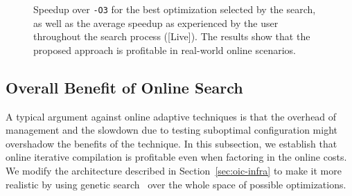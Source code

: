\begin{figure}[t]
  \centering
  \hfill
  \hfill
  \caption{Speedup over \texttt{-O3} for the best optimization selected by the search, as well as the average speedup as experienced by the
    user throughout the search process ([Live]). The results show that the proposed approach is profitable in real-world online scenarios.}
  \label{fig:deployment_cost}
\end{figure}

\subsection{Overall Benefit of Online Search}\label{subsec:search}

A typical argument against online adaptive techniques is that the overhead of management and the slowdown due to testing suboptimal
configuration might overshadow the benefits of the technique. In this subsection, we establish that online iterative compilation is
profitable even when factoring in the online costs. We modify the architecture described in Section~\ref{sec:oic-infra} to make it more
realistic by using genetic search~\cite{knijnenburg02,kulkarni04} over the whole space of possible optimizations. 

